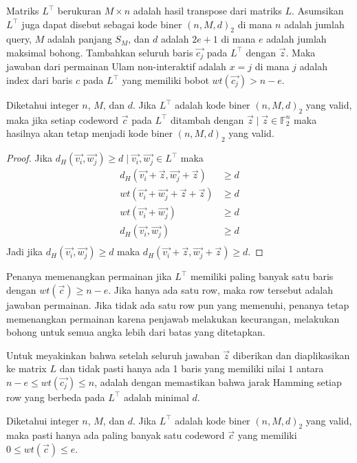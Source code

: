 Matriks $L^\top$ berukuran $M \times n$ adalah hasil transpose dari matriks $L$. Asumsikan $L^\top$ juga dapat disebut sebagai kode biner $(n,M,d)_2$ di mana $n$ adalah jumlah query, $M$ adalah panjang $S_M$, dan $d$ adalah $2e+1$ di mana $e$ adalah jumlah maksimal bohong. Tambahkan seluruh baris $\vec{c_j}$ pada $L^\top$ dengan $\vec{z}$. Maka jawaban dari permainan Ulam non-interaktif adalah $x = j$ di mana $j$ adalah index dari baris $c$ pada $L^\top$ yang memiliki bobot $wt(\vec{c_j}) > n-e$.

\begin{lemma}
Diketahui integer $n$, $M$, dan $d$. Jika $L^\top$ adalah kode biner $(n,M,d)_2$ yang valid, maka jika setiap codeword $\vec{c}$ pada $L^\top$ ditambah dengan $\vec{z} \mid \vec{z} \in \mathbb{F}_2^n$ maka hasilnya akan tetap menjadi kode biner $(n,M,d)_2$ yang valid.
\end{lemma}

\begin{proof}
Jika $d_H(\vec{v_i},\vec{w_j}) \ge d \mid \vec{v_i},\vec{w_j} \in L^\top$ maka
\begin{align*}
d_H(\vec{v_i}+\vec{z},\vec{w_j}+\vec{z}) &\ge d \\
wt(\vec{v_i}+\vec{w_j}+\vec{z}+\vec{z}) &\ge d \\
wt(\vec{v_i}+\vec{w_j}) &\ge d \\
d_H(\vec{v_i},\vec{w_j}) &\ge d \\
\end{align*}
Jadi jika $d_H(\vec{v_i},\vec{w_j}) \ge d$ maka $d_H(\vec{v_i}+\vec{z},\vec{w_j}+\vec{z}) \ge d$.
\end{proof}

Penanya memenangkan permainan jika $L^\top$ memiliki paling banyak satu baris dengan $wt(\vec{c}) \ge n-e$. Jika hanya ada satu row, maka row tersebut adalah jawaban permainan. Jika tidak ada satu row pun yang memenuhi, penanya tetap memenangkan permainan karena penjawab melakukan kecurangan, melakukan bohong untuk semua angka lebih dari batas yang ditetapkan.

Untuk meyakinkan bahwa setelah seluruh jawaban $\vec{z}$ diberikan dan diaplikasikan ke matrix $L$ dan tidak pasti hanya ada 1 baris yang memiliki nilai $1$ antara $n-e \le wt(\vec{c_j}) \le n$, adalah dengan memastikan bahwa jarak Hamming setiap row yang berbeda pada $L^\top$ adalah minimal $d$.

\begin{lemma}
Diketahui integer $n$, $M$, dan $d$. Jika $L^\top$ adalah kode biner $(n,M,d)_2$ yang valid, maka pasti hanya ada paling banyak satu codeword $\vec{c}$ yang memiliki $0 \le wt(\vec{c}) \le e$.
\end{lemma}

